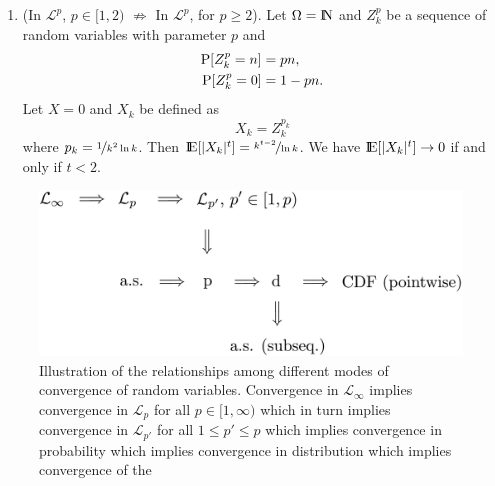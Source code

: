 \documentclass[a4paper,10pt]{article}
\begin{document}
\begin{enumerate}
 \item (In $\mathcal{L}^p$, $p\in[1,2)$ $\not\Rightarrow$ In $\mathcal{L}^p$, for $p\geq 2$).
       Let $\Omega=\N$ and $Z_k^p$ be a sequence of random variables with parameter $p$ and 
       \begin{align*}
        \mathrm{P}[Z_k^p=n] &= pn,\\
        \mathrm{P}[Z_k^p=0] &= 1-pn.
       \end{align*}
       Let $X=0$ and $X_k$ be defined as
       \[
        X_k = Z_{k}^{p_k}
       \]
       where $p_k=\nicefrac{1}{k^2 \ln k}$. 
       Then $\E[|X_k|^t]=\nicefrac{k^{t-2}}{\ln k}$. 
       We have $\E[|X_k|^t]\to 0$ if and only if $t<2$.
\end{enumerate}
\begin{figure}
 \centering
 \includegraphics[width=0.6\linewidth]{figures/convergence_rv}
 \caption{Illustration of the relationships among different modes of convergence of random variables. 
         Convergence in $\mathcal{L}_\infty$ implies convergence in $\mathcal{L}_p$ for all $p\in[1,\infty)$
         which in turn implies convergence in $\mathcal{L}_{p'}$ for all $1\leq p' \leq p$ which implies 
         convergence in probability which implies convergence in distribution which implies 
         convergence of the }
\end{figure}
\end{document}

